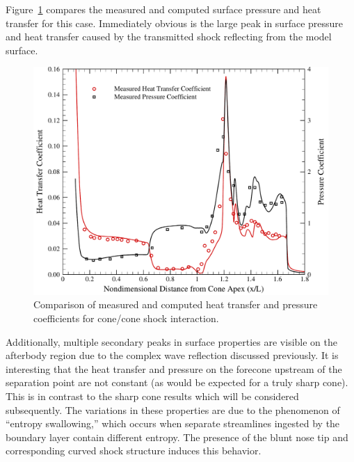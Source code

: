 Figure~\ref{fig:double_cone_ch_cp} compares the measured and computed surface pressure and heat transfer for this case.  Immediately obvious is the large peak in surface pressure and heat transfer caused by the transmitted shock reflecting from the model surface.  
\begin{figure}[hbtp]
  \begin{center}
    \includegraphics[width=\textwidth]{figures/holden_double_cone/ch_cp_comparison}
    \caption[Comparison of measured and computed heat transfer and pressure coefficients for cone/cone shock interaction.]{Comparison of measured and computed heat transfer and pressure coefficients for cone/cone shock interaction.\label{fig:double_cone_ch_cp}}
  \end{center}  
\end{figure}
Additionally, multiple secondary peaks in surface properties are visible on the afterbody region due to the complex wave reflection discussed previously.  It is interesting that the heat transfer and pressure on the forecone upstream of the separation point are not constant (as would be expected for a truly sharp cone).  This is in contrast to the sharp cone results which will be considered subsequently.  The variations in these properties are due to the phenomenon of ``entropy swallowing,'' which occurs when separate streamlines ingested by the boundary layer contain different entropy.  The presence of the blunt nose tip and corresponding curved shock structure induces this behavior.


\clearpage
